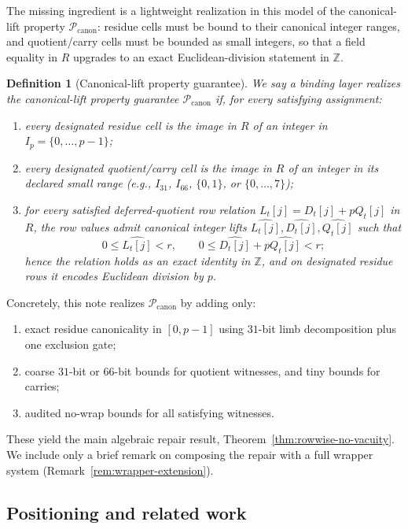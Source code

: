 ﻿\documentclass[11pt]{article}
\newtheorem{definition}[theorem]{Definition}
\newcommand{\Z}{\mathbb{Z}}
\newcommand{\wt}[1]{\widehat{#1}}
\begin{document}
The missing ingredient is a lightweight realization in this model of the canonical-lift
property \(\mathcal{P}_{\mathrm{canon}}\): residue cells must be bound to
their canonical integer ranges, and quotient/carry cells must be bounded as
small integers, so that a field equality in \(R\) upgrades to an exact
Euclidean-division statement in \(\Z\).
\begin{definition}[Canonical-lift property guarantee]
\label{def:f-canon}
We say a binding layer realizes the canonical-lift property guarantee
\(\mathcal{P}_{\mathrm{canon}}\) if, for every satisfying assignment:
\begin{enumerate}[label=(\roman*),leftmargin=2em]
    \item every designated residue cell is the image in \(R\) of an integer in
    \(I_p=\{0,\dots,p-1\}\);
    \item every designated quotient/carry cell is the image in \(R\) of an
    integer in its declared small range (e.g., \(I_{31}\), \(I_{66}\),
    \(\{0,1\}\), or \(\{0,\dots,7\}\));
    \item for every satisfied deferred-quotient row relation
    \(L_t[j]=D_t[j]+pQ_t[j]\) in \(R\), the row values admit canonical integer
    lifts \(\wt{L_t[j]},\wt{D_t[j]},\wt{Q_t[j]}\) such that
    \[
    0\le \wt{L_t[j]}<r,
    \qquad
    0\le \wt{D_t[j]}+p\wt{Q_t[j]}<r;
    \]
    hence the relation holds as an exact identity in \(\Z\), and on designated
    residue rows it encodes Euclidean division by \(p\).
\end{enumerate}
\end{definition}
Concretely, this note realizes \(\mathcal{P}_{\mathrm{canon}}\) by adding only:
\begin{enumerate}[label=(\roman*),leftmargin=2em]
    \item exact residue canonicality in \([0,p-1]\) using \(31\)-bit limb
    decomposition plus one exclusion gate;
    \item coarse \(31\)-bit or \(66\)-bit bounds for quotient witnesses, and
    tiny bounds for carries;
    \item audited no-wrap bounds for all satisfying witnesses.
\end{enumerate}
These yield the main algebraic repair result, Theorem~\ref{thm:rowwise-no-vacuity}.
We include only a brief remark on composing the repair with a full wrapper
system (Remark~\ref{rem:wrapper-extension}).

\subsection{Positioning and related work}
\end{document}
